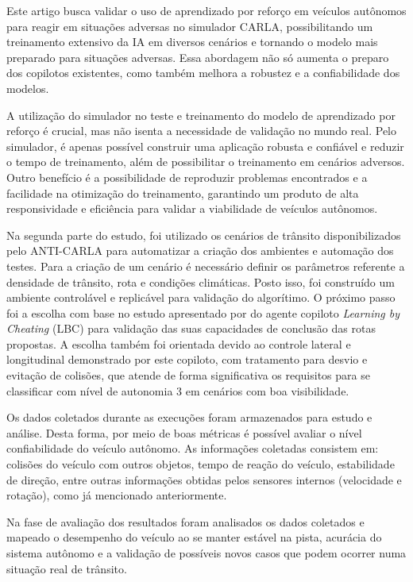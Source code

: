\documentclass[a4paper,12pt,Times]{article}
\begin{document}
Este artigo busca validar o uso de aprendizado por reforço em veículos autônomos para reagir em situações adversas no simulador CARLA, possibilitando um treinamento extensivo da IA em diversos cenários e tornando o modelo mais preparado para situações adversas. Essa abordagem não só aumenta o preparo dos copilotos existentes, como também melhora a robustez e a confiabilidade dos modelos.

A utilização do simulador no teste e treinamento do modelo de aprendizado por reforço é crucial, mas não isenta a necessidade de validação no mundo real. Pelo simulador, é apenas possível construir uma aplicação robusta e confiável e reduzir o tempo de treinamento, além de possibilitar o treinamento em cenários adversos. Outro benefício é a possibilidade de reproduzir problemas encontrados e a facilidade na otimização do treinamento, garantindo um produto de alta responsividade e eficiência para validar a viabilidade de veículos autônomos.

Na segunda parte do estudo, foi utilizado os cenários de trânsito disponibilizados pelo ANTI-CARLA para automatizar a criação dos ambientes e automação dos testes. Para a criação de um cenário é necessário definir os parâmetros referente a densidade de trânsito, rota e condições climáticas. Posto isso, foi construído um ambiente controlável e replicável para validação do algorítimo. O próximo passo foi a escolha com base no estudo apresentado por  do agente copiloto \textit{Learning by Cheating} (LBC) para validação das suas capacidades de conclusão das rotas propostas. A escolha também foi orientada devido ao controle lateral e longitudinal demonstrado por este copiloto, com tratamento para desvio e evitação de colisões, que atende de forma significativa os requisitos para se classificar com nível de autonomia 3 em cenários com boa visibilidade.


Os dados coletados durante as execuções foram armazenados para estudo e análise. Desta forma, por meio de boas métricas é possível avaliar o nível confiabilidade do veículo autônomo. As informações coletadas consistem em: colisões do veículo com outros objetos, tempo de reação do veículo, estabilidade de direção, entre outras informações obtidas pelos sensores internos (velocidade e rotação), como já mencionado anteriormente.


Na fase de avaliação dos resultados foram analisados os dados coletados e mapeado o  desempenho do veículo ao se manter estável na pista, acurácia do sistema autônomo e a validação de possíveis novos casos que podem ocorrer numa situação real de trânsito.
\end{document}
